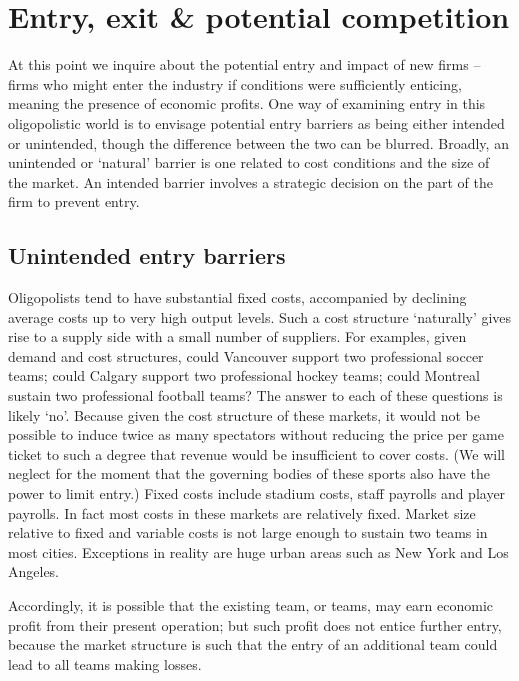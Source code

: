 \section{Entry, exit \& potential competition}\label{sec:ch11sec6}

At this point we inquire about the potential entry and impact of new firms
-- firms who might enter the industry if conditions were sufficiently
enticing, meaning the presence of economic profits. One way of examining
entry in this oligopolistic world is to envisage potential entry barriers as
being either intended or unintended, though the difference between the two
can be blurred. Broadly, an unintended or `natural' barrier is one related
to cost conditions and the size of the market. An intended barrier involves
a strategic decision on the part of the firm to prevent entry.

\subsection*{Unintended entry barriers}

Oligopolists tend to have substantial fixed costs, accompanied by declining
average costs up to very high output levels. Such a cost structure
`naturally' gives rise to a supply side with a small number of suppliers.
For examples, given demand and cost structures, could Vancouver support two
professional soccer teams; could Calgary support two professional hockey
teams; could Montreal sustain two professional football teams? The answer to
each of these questions is likely `no'. Because given the cost structure of
these markets, it would not be possible to induce twice as many spectators
without reducing the price per game ticket to such a degree that revenue
would be insufficient to cover costs. (We will neglect for the moment that
the governing bodies of these sports also have the power to limit entry.)
Fixed costs include stadium costs, staff payrolls and player payrolls. In
fact most costs in these markets are relatively fixed. Market size relative
to fixed and variable costs is not large enough to sustain two teams in most
cities. Exceptions in reality are huge urban areas such as New York and Los
Angeles.

Accordingly, it is possible that the existing team, or teams, may earn
economic profit from their present operation; but such profit does not
entice further entry, because the market structure is such that the entry of
an additional team could lead to all teams making losses.

